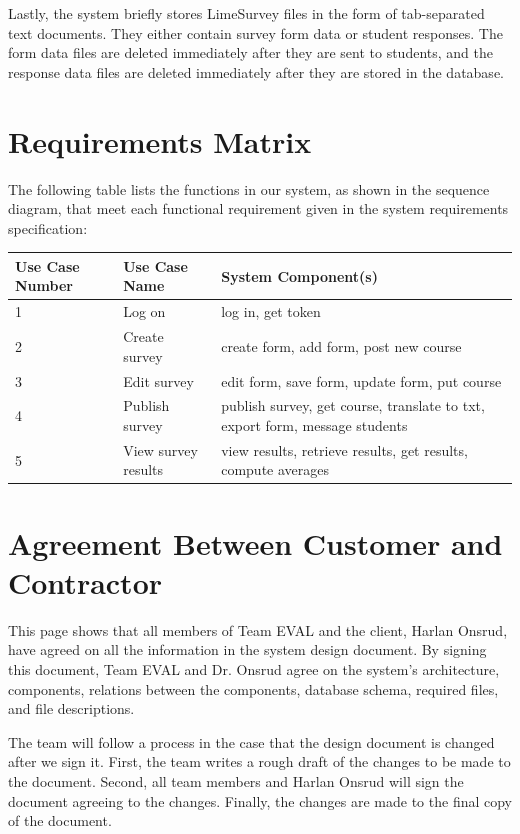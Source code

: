 \documentclass{article}
\begin{document}
Lastly, the system briefly stores LimeSurvey files in the form of tab-separated text documents. They either contain survey form data or student responses. The form data files are deleted immediately after they are sent to students, and the response data files are deleted immediately after they are stored in the database.

\section{Requirements Matrix}

The following table lists the functions in our system, as shown in the sequence diagram, that meet each functional requirement given in the system requirements specification:

\begin{center}
\begin{tabular}{|p{3.2cm}|p{3.2cm}|p{6cm}|} 
\hline
\textbf{Use Case Number} & \textbf{Use Case Name} & \textbf{System Component(s)} \\
\hline
1 & Log on & log in, get token\\ 
\hline
2 & Create survey & create form, add form, post new course\\ 
\hline
3 & Edit survey & edit form, save form, update form, put course\\ 
\hline
4 & Publish survey & publish survey, get course, translate to txt, export form, message students\\ 
\hline
5 & View survey results & view results, retrieve results, get results, compute averages\\ 
\hline
\end{tabular}
\end{center}

\appendix

\newpage
\section{Agreement Between Customer and Contractor}
This page shows that all members of Team EVAL and the client, Harlan Onsrud, have agreed on all the information in the system design document. By signing this document, Team EVAL and Dr. Onsrud agree on the system's architecture, components, relations between the components, database schema, required files, and file descriptions.

The team will follow a process in the case that the design document is changed after we sign it. First, the team writes a rough draft of the changes to be made to the document. Second, all team members and Harlan Onsrud will sign the document agreeing to the changes. Finally, the changes are made to the final copy of the document.
\end{document}
